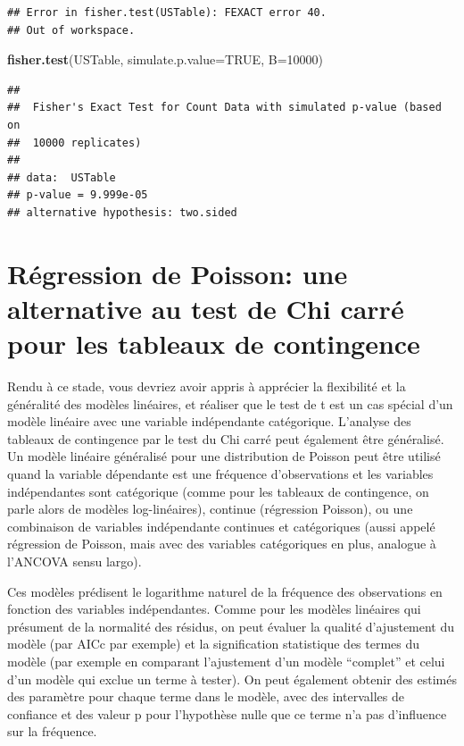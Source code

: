 \documentclass[12pt,]{book}
\newenvironment{Shaded}{\begin{snugshade}}{\end{snugshade}}
\newcommand{\DataTypeTok}[1]{\textcolor[rgb]{0.13,0.29,0.53}{#1}}
\newcommand{\DecValTok}[1]{\textcolor[rgb]{0.00,0.00,0.81}{#1}}
\newcommand{\KeywordTok}[1]{\textcolor[rgb]{0.13,0.29,0.53}{\textbf{#1}}}
\newcommand{\NormalTok}[1]{#1}
\newcommand{\OtherTok}[1]{\textcolor[rgb]{0.56,0.35,0.01}{#1}}
\begin{document}
\begin{verbatim}
## Error in fisher.test(USTable): FEXACT error 40.
## Out of workspace.
\end{verbatim}

\begin{Shaded}
\begin{Highlighting}[]
\KeywordTok{fisher.test}\NormalTok{(USTable, }\DataTypeTok{simulate.p.value=}\OtherTok{TRUE}\NormalTok{, }\DataTypeTok{B=}\DecValTok{10000}\NormalTok{)}
\end{Highlighting}
\end{Shaded}

\begin{verbatim}
## 
##  Fisher's Exact Test for Count Data with simulated p-value (based on
##  10000 replicates)
## 
## data:  USTable
## p-value = 9.999e-05
## alternative hypothesis: two.sided
\end{verbatim}

\hypertarget{ruxe9gression-de-poisson-une-alternative-au-test-de-chi-carruxe9-pour-les-tableaux-de-contingence}{%
\section{Régression de Poisson: une alternative au test de Chi carré pour les tableaux de contingence}\label{ruxe9gression-de-poisson-une-alternative-au-test-de-chi-carruxe9-pour-les-tableaux-de-contingence}}

Rendu à ce stade, vous devriez avoir appris à apprécier la flexibilité et la généralité des modèles linéaires, et réaliser que le test de t est un cas spécial d'un modèle linéaire avec une variable indépendante catégorique. L'analyse des tableaux de contingence par le test du Chi carré peut également être généralisé. Un modèle linéaire généralisé pour une distribution de Poisson peut être utilisé quand la variable dépendante est une fréquence d'observations et les variables indépendantes sont catégorique (comme pour les tableaux de contingence, on parle alors de modèles log-linéaires), continue (régression Poisson), ou une combinaison de variables indépendante continues et catégoriques (aussi appelé régression de Poisson, mais avec des variables catégoriques en plus, analogue à l'ANCOVA sensu largo).

Ces modèles prédisent le logarithme naturel de la fréquence des observations en fonction des variables indépendantes. Comme pour les modèles linéaires qui présument de la normalité des résidus, on peut évaluer la qualité d'ajustement du modèle (par AICc par exemple) et la signification statistique des termes du modèle (par exemple en comparant l'ajustement d'un modèle ``complet'' et celui d'un modèle qui exclue un terme à tester). On peut également obtenir des estimés des paramètre pour chaque terme dans le modèle, avec des intervalles de confiance et des valeur p pour l'hypothèse nulle que ce terme n'a pas d'influence sur la fréquence.
\end{document}
